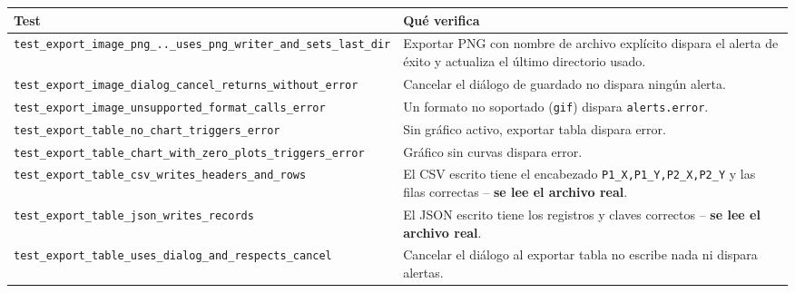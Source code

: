 \documentclass[11pt,a4paper]{article}
\begin{document}
\begin{center}
\begin{longtable}{L{6cm}L{8.5cm}}
\toprule
\textbf{Test} & \textbf{Qué verifica} \\
\midrule
\endhead
\texttt{test\_\allowbreak export\_\allowbreak image\_\allowbreak png\_\allowbreak ..\_\allowbreak uses\_\allowbreak png\_\allowbreak writer\_\allowbreak and\_\allowbreak sets\_\allowbreak last\_\allowbreak dir} & Exportar PNG con nombre de archivo explícito dispara el alerta de éxito y actualiza el último directorio usado. \\
\texttt{test\_\allowbreak export\_\allowbreak image\_\allowbreak dialog\_\allowbreak cancel\_\allowbreak returns\_\allowbreak without\_\allowbreak error} & Cancelar el diálogo de guardado no dispara ningún alerta. \\
\texttt{test\_\allowbreak export\_\allowbreak image\_\allowbreak unsupported\_\allowbreak format\_\allowbreak calls\_\allowbreak error} & Un formato no soportado (\texttt{gif}) dispara \texttt{alerts.error}. \\
\texttt{test\_\allowbreak export\_\allowbreak table\_\allowbreak no\_\allowbreak chart\_\allowbreak triggers\_\allowbreak error} & Sin gráfico activo, exportar tabla dispara error. \\
\texttt{test\_\allowbreak export\_\allowbreak table\_\allowbreak chart\_\allowbreak with\_\allowbreak zero\_\allowbreak plots\_\allowbreak triggers\_\allowbreak error} & Gráfico sin curvas dispara error. \\
\texttt{test\_\allowbreak export\_\allowbreak table\_\allowbreak csv\_\allowbreak writes\_\allowbreak headers\_\allowbreak and\_\allowbreak rows} & El CSV escrito tiene el encabezado \texttt{P1\_\allowbreak X,P1\_\allowbreak Y,P2\_\allowbreak X,P2\_\allowbreak Y} y las filas correctas -- \textbf{se lee el archivo real}. \\
\texttt{test\_\allowbreak export\_\allowbreak table\_\allowbreak json\_\allowbreak writes\_\allowbreak records} & El JSON escrito tiene los registros y claves correctos -- \textbf{se lee el archivo real}. \\
\texttt{test\_\allowbreak export\_\allowbreak table\_\allowbreak uses\_\allowbreak dialog\_\allowbreak and\_\allowbreak respects\_\allowbreak cancel} & Cancelar el diálogo al exportar tabla no escribe nada ni dispara alertas. \\
\bottomrule
\end{longtable}
\end{center}
\end{document}
